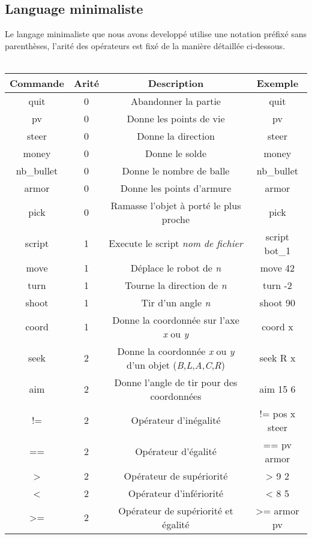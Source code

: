 \documentclass[a4paper, 11pt]{article}
\begin{document}
\subsection{Language minimaliste}
Le langage minimaliste que nous avons developpé utilise une notation préfixé sans parenthèses, l'arité des opérateurs est fixé de la manière détaillée ci-dessous.\\\\
\begin{tabular}{|c|c|c|c|}
   \hline
   Commande & Arité & Description & Exemple \\
	 \hline
   quit & 0 & Abandonner la partie & quit \\
   \hline
   pv & 0 & Donne les points de vie & pv \\
   \hline
	 steer & 0 & Donne la direction & steer \\
	 \hline
   money & 0 & Donne le solde & money \\
   \hline
   nb\_bullet & 0 & Donne le nombre de balle & nb\_bullet \\
   \hline
	 armor & 0 & Donne les points d'armure & armor \\
	 \hline
	 pick & 0 & Ramasse l'objet à porté le plus proche & pick \\
   \hline
	 script & 1 & Execute le script \emph{nom de fichier} & script bot\_1 \\
   \hline
   move & 1 & Déplace le robot de \emph{n} & move 42 \\
   \hline
	 turn & 1 & Tourne la direction de \emph{n} & turn -2 \\
	 \hline
   shoot & 1 & Tir d'un angle \emph{n} & shoot 90 \\
   \hline
   coord & 1 & Donne la coordonnée sur l'axe \emph{x} ou \emph{y} & coord x \\
   \hline
	 seek & 2 & Donne la coordonnée \emph{x} ou \emph{y} d'un objet (\emph{B},\emph{L},\emph{A},\emph{C},\emph{R}) & seek R x \\
   \hline
	 aim & 2 & Donne l'angle de tir pour des coordonnées & aim 15 6 \\
   \hline
	 != & 2 & Opérateur d'inégalité & != pos x steer \\
	 \hline
   == & 2 & Opérateur d'égalité  & == pv armor \\
   \hline
   > & 2 & Opérateur de supériorité  & > 9 2 \\
   \hline
	 < & 2 & Opérateur d'infériorité  & < 8 5 \\
	 \hline
   >= & 2 & Opérateur de supériorité et égalité  & >= armor pv \\

\end{tabular}
\end{document}
